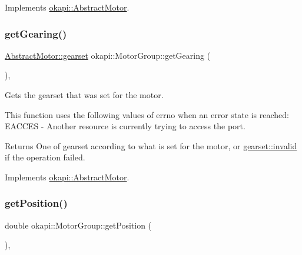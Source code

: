Implements \mbox{\hyperlink{classokapi_1_1AbstractMotor_aaae44487bf20ac2e18b52ee57b7a06ad}{okapi\+::\+Abstract\+Motor}}.

\mbox{\label{classokapi_1_1MotorGroup_abe6d309d6e883b469997c4ddc4584834}} 
\subsubsection{\texorpdfstring{getGearing()}{getGearing()}}
{\footnotesize\ttfamily \mbox{\hyperlink{classokapi_1_1AbstractMotor_a88aaa6ea2fa10f5520a537bbf26774d5}{Abstract\+Motor\+::gearset}} okapi\+::\+Motor\+Group\+::get\+Gearing (\begin{DoxyParamCaption}{ }\end{DoxyParamCaption})\hspace{0.3cm}{\ttfamily [override]}, {\ttfamily [virtual]}}

Gets the gearset that was set for the motor.

This function uses the following values of errno when an error state is reached\+: E\+A\+C\+C\+ES -\/ Another resource is currently trying to access the port.

\begin{DoxyReturn}{Returns}
One of gearset according to what is set for the motor, or {\ttfamily \mbox{\hyperlink{classokapi_1_1AbstractMotor_a88aaa6ea2fa10f5520a537bbf26774d5afedb2d84cafe20862cb4399751a8a7e3}{gearset\+::invalid}}} if the operation failed. 
\end{DoxyReturn}


Implements \mbox{\hyperlink{classokapi_1_1AbstractMotor_adc90f1fc8af6c34c4e833355693474bb}{okapi\+::\+Abstract\+Motor}}.

\mbox{\label{classokapi_1_1MotorGroup_a6bf3c5a2f5caf0e5b02e8dcf2e8130d9}} 
\subsubsection{\texorpdfstring{getPosition()}{getPosition()}}
{\footnotesize\ttfamily double okapi\+::\+Motor\+Group\+::get\+Position (\begin{DoxyParamCaption}{ }\end{DoxyParamCaption})\hspace{0.3cm}{\ttfamily [override]}, {\ttfamily [virtual]}}

